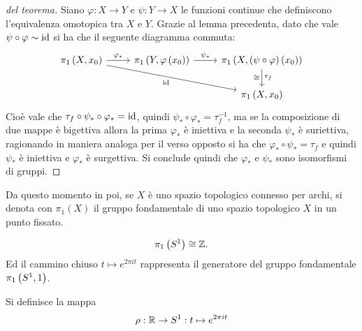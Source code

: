 \documentclass[]{article}
\begin{document}
\begin{proof} [del teorema] \nl
    Siano $\varphi: X \to Y$ e $\psi: Y \to X$ le funzioni continue che definiscono l'equivalenza omotopica tra $X$ e $Y$. \nl
    Grazie al lemma precedenta, dato che vale $\psi \circ \varphi \sim \mathrm{id}$ si ha che il seguente diagramma commuta:
    \[
    \begin{tikzcd}
        {\pi_1\left(X, x_0 \right)} & {\pi_1\left(Y, \varphi\left(x_0\right) \right)} & {\pi_1\left(X, (\psi \circ \varphi)\left(x_0\right) \right)} \\
        && {\pi_1\left(X, x_0 \right)}
        \arrow["{\varphi_*}", from=1-1, to=1-2]
        \arrow["\id"', from=1-1, to=2-3]
        \arrow["{\psi_*}", from=1-2, to=1-3]
        \arrow["{\tau_f}" right, "{\cong}" left, from=1-3, to=2-3]
    \end{tikzcd}
    \]
    Cio\`e vale che $ \tau_f \circ \psi_* \circ \varphi_* = \mathrm{id}$, quindi $\psi_* \circ \varphi_* = \tau_f^{-1}$, ma se la composizione di due mappe
    \`e bigettiva allora la prima $\varphi_*$ \`e iniettiva e la seconda $\psi_*$ \`e suriettiva, ragionando in maniera analoga
    per il verso opposto si ha che $\varphi_* \circ \psi_* = \tau_f$ e quindi $\psi_*$ \`e iniettiva e $\varphi_*$ \`e surgettiva. \nl
    Si conclude quindi che $\varphi_*$ e $\psi_*$ sono isomorfismi di gruppi.
         
\end{proof}

Da questo momento in poi, se $X$ \`e uno spazio topologico connesso per archi, si denota con $\pi_1(X)$ il gruppo fondamentale di uno spazio topologico $X$ in un punto fissato.

\begin{theorem}  \nl
    \[
        \pi_1\left(S^{1} \right) \cong \mathbb{Z}.
    \]
    Ed il cammino chiuso $t \mapsto e^{2\pi i t}$ rappresenta il generatore del gruppo fondamentale $\pi_1\left(S^{1}, 1\right)$.
\end{theorem}

\begin{definition}  \nl
    Si definisce la mappa
    \[
        \rho: \mathbb{R} \to S^{1}: t \mapsto e^{2\pi i t}
    \]
\end{definition}
\end{document}
